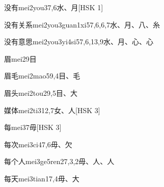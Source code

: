 \begin{entry}{没有}{mei2you3}{7,6}{⽔、⽉}[HSK 1]
\end{entry}

\begin{entry}{没有关系}{mei2you3guan1xi5}{7,6,6,7}{⽔、⽉、⼋、⽷}
\end{entry}

\begin{entry}{没有意思}{mei2you3yi4si5}{7,6,13,9}{⽔、⽉、⼼、⼼}
\end{entry}

\begin{entry}{眉}{mei2}{9}{⽬}
\end{entry}

\begin{entry}{眉毛}{mei2mao5}{9,4}{⽬、⽑}
\end{entry}

\begin{entry}{眉头}{mei2tou2}{9,5}{⽬、⼤}
\end{entry}

\begin{entry}{媒体}{mei2ti3}{12,7}{⼥、⼈}[HSK 3]
\end{entry}

\begin{entry}{每}{mei3}{7}{⽏}[HSK 3]
\end{entry}

\begin{entry}{每次}{mei3ci4}{7,6}{⽏、⽋}
\end{entry}

\begin{entry}{每个人}{mei3ge5ren2}{7,3,2}{⽏、⼈、⼈}
\end{entry}

\begin{entry}{每天}{mei3tian1}{7,4}{⽏、⼤}
\end{entry}

